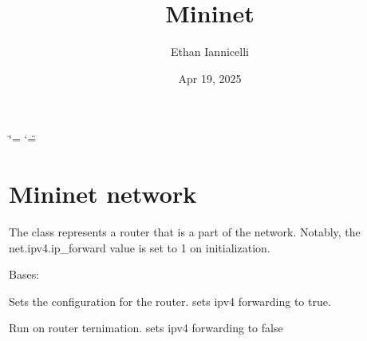 \documentclass[letterpaper,10pt,english,openany,oneside]{sphinxmanual}
\title{Mininet}
\date{Apr 19, 2025}
\author{Ethan Iannicelli}
\begin{document}
\ifdefined\shorthandoff
  \ifnum\catcode`\=\string=\active\shorthandoff{=}\fi
  \ifnum\catcode`\"=\active{}\fi
\fi

\pagestyle{empty}
\sphinxmaketitle
\pagestyle{plain}
\sphinxtableofcontents
\pagestyle{normal}
\label{\detokenize{index::doc}}



\chapter{Mininet network}
\label{\detokenize{index:mininet-network}}
\sphinxAtStartPar
The  class represents a router that is a part of the network.
Notably, the net.ipv4.ip\_forward value is set to 1 on initialization.

\begin{fulllineitems}
\label{\detokenize{index:layer3_network_code.LinuxRouter}}
\pysigstartsignatures
\pysigline
{}
\pysigstopsignatures
\sphinxAtStartPar
Bases: 

\begin{fulllineitems}
\label{\detokenize{index:layer3_network_code.LinuxRouter.config}}
\pysigstartsignatures
\pysiglinewithargsret
{}
{}
{}
\pysigstopsignatures
\sphinxAtStartPar
Sets the configuration for the router. sets ipv4 forwarding to true.

\end{fulllineitems}


\begin{fulllineitems}
\label{\detokenize{index:layer3_network_code.LinuxRouter.terminate}}
\pysigstartsignatures
\pysiglinewithargsret
{}
{}
{}
\pysigstopsignatures
\sphinxAtStartPar
Run on router ternimation. sets ipv4 forwarding to false

\end{fulllineitems}


\end{fulllineitems}
\end{document}
